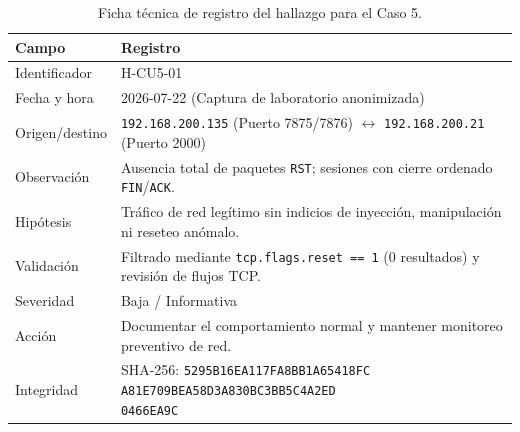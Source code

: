 \begin{table}[htbp]
    \centering
    \footnotesize
    \caption{Ficha técnica de registro del hallazgo para el Caso 5.}
    \label{tab:ficha_caso_5}
    \renewcommand{\arraystretch}{1.15}
    \begin{tabularx}{\textwidth}{@{}>{\raggedright\arraybackslash}p{} Y@{}}
        \toprule
        \textbf{Campo} & \textbf{Registro} \\
        \midrule
        Identificador & H-CU5-01 \\
        Fecha y hora & 2026-07-22 (Captura de laboratorio anonimizada) \\
        Origen/destino & \texttt{192.168.200.135} (Puerto 7875/7876) $\leftrightarrow$ \texttt{192.168.200.21} (Puerto 2000) \\
        Observación & Ausencia total de paquetes \texttt{RST}; sesiones con cierre ordenado \texttt{FIN}/\texttt{ACK}. \\
        Hipótesis & Tráfico de red legítimo sin indicios de inyección, manipulación ni reseteo anómalo. \\
        Validación & Filtrado mediante \texttt{tcp.flags.reset == 1} (0 resultados) y revisión de flujos TCP. \\
        Severidad & Baja / Informativa \\
        Acción & Documentar el comportamiento normal y mantener monitoreo preventivo de red. \\
        Integridad & \parbox[t]{\hsize}{\raggedright SHA-256: \texttt{5295B16EA117FA8BB1A65418FC}\\ \texttt{A81E709BEA58D3A830BC3BB5C4A2ED}\\ \texttt{0466EA9C}} \\
        \bottomrule
    \end{tabularx}
\end{table}
